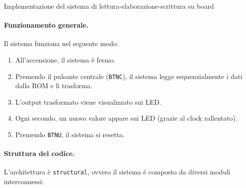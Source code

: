 \begin{code}
    \inputminted{vhdl}{vhdl/rom_m_mem_onboard.vhd}
    \caption{Implementazione del sistema di lettura-elaborazione-scrittura su board}
    \label{cod:rom_m_mem_onboard}
\end{code}

\paragraph{Funzionamento generale.}
Il sistema funziona nel seguente modo:

\begin{enumerate}
    \item All'accensione, il sistema è fermo.
    \item Premendo il pulsante centrale (\texttt{BTNC}), il sistema legge sequenzialmente i dati dalla ROM e li trasforma.
    \item L'output trasformato viene visualizzato sui LED.
    \item Ogni secondo, un nuovo valore appare sui LED (grazie al clock rallentato).
    \item Premendo \texttt{BTNU}, il sistema si resetta.
\end{enumerate}

\paragraph{Struttura del codice.}
L’architettura è \texttt{structural}, ovvero il sistema è composto da diversi moduli interconnessi:

